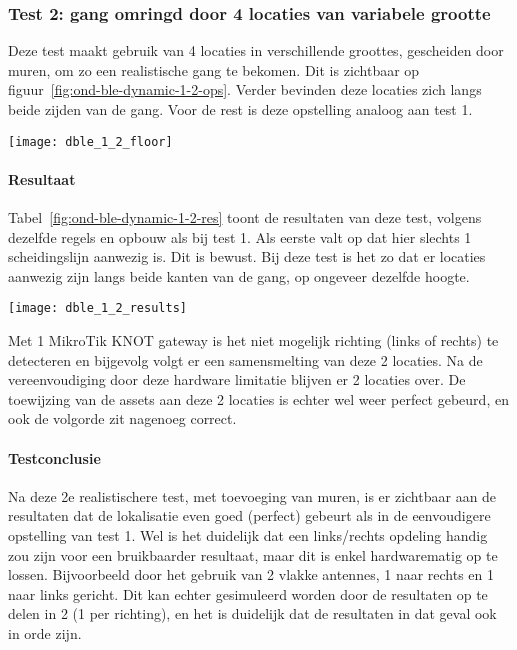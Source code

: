 \subsubsection{Test 2: gang omringd door 4 locaties van variabele grootte}
\label{sec:ond-ble-4-2}
\begin{minipage}{0.55\textwidth}
Deze test maakt gebruik van 4 locaties in verschillende groottes, gescheiden door muren, om zo een realistische gang te bekomen. Dit is zichtbaar op figuur~\ref{fig:ond-ble-dynamic-1-2-ops}. Verder bevinden deze locaties zich langs beide zijden van de gang. Voor de rest is deze opstelling analoog aan test 1.
\end{minipage}
\hfill
\begin{minipage}{0.42\textwidth}
	\texttt{[image: dble\_1\_2\_floor]}
	\label{fig:ond-ble-dynamic-1-2-ops}
\end{minipage}

\paragraph{Resultaat}
\begin{minipage}{0.42\textwidth}
Tabel~\ref{fig:ond-ble-dynamic-1-2-res} toont de resultaten van deze test, volgens dezelfde regels en opbouw als bij test 1. Als eerste valt op dat hier slechts 1 scheidingslijn aanwezig is. Dit is bewust. Bij deze test is het zo dat er locaties aanwezig zijn langs beide kanten van de gang, op ongeveer dezelfde hoogte. 
\end{minipage}
\hfill
\begin{minipage}{0.55\textwidth}
	\texttt{[image: dble\_1\_2\_results]}
	\label{fig:ond-ble-dynamic-1-2-res}
\end{minipage}

Met 1 MikroTik KNOT gateway is het niet mogelijk richting (links of rechts) te detecteren en bijgevolg volgt er een samensmelting van deze 2 locaties. Na de vereenvoudiging door deze hardware limitatie blijven er 2 locaties over. De toewijzing van de assets aan deze 2 locaties is echter wel weer perfect gebeurd, en ook de volgorde zit nagenoeg correct.

\paragraph{Testconclusie}
Na deze 2e realistischere test, met toevoeging van muren, is er zichtbaar aan de resultaten dat de lokalisatie even goed (perfect) gebeurt als in de eenvoudigere opstelling van test 1. Wel is het duidelijk dat een links/rechts opdeling handig zou zijn voor een bruikbaarder resultaat, maar dit is enkel hardwarematig op te lossen. Bijvoorbeeld door het gebruik van 2 vlakke antennes, 1 naar rechts en 1 naar links gericht. Dit kan echter gesimuleerd worden door de resultaten op te delen in 2 (1 per richting), en het is duidelijk dat de resultaten in dat geval ook in orde zijn.

